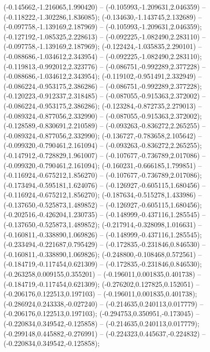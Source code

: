  (-0.145662,-1.216065,1.990420) -- (-0.105993,-1.209631,2.046359) -- (-0.118222,-1.302286,1.836085);
 (-0.134630,-1.143745,2.132689) -- (-0.097758,-1.139169,2.187969) -- (-0.105993,-1.209631,2.046359);
 (-0.127192,-1.085325,2.228613) -- (-0.092225,-1.082490,2.283110) -- (-0.097758,-1.139169,2.187969);
 (-0.122424,-1.035835,2.290101) -- (-0.088686,-1.034612,2.343954) -- (-0.092225,-1.082490,2.283110);
 (-0.119813,-0.992012,2.323776) -- (-0.086751,-0.992289,2.377228) -- (-0.088686,-1.034612,2.343954);
 (-0.119102,-0.951491,2.332949) -- (-0.086224,-0.953175,2.386286) -- (-0.086751,-0.992289,2.377228);
 (-0.120223,-0.912337,2.318485) -- (-0.087055,-0.915363,2.372002) -- (-0.086224,-0.953175,2.386286);
 (-0.123284,-0.872735,2.279013) -- (-0.089324,-0.877056,2.332990) -- (-0.087055,-0.915363,2.372002);
 (-0.128589,-0.830691,2.210589) -- (-0.093263,-0.836272,2.265255) -- (-0.089324,-0.877056,2.332990);
 (-0.136727,-0.783658,2.105642) -- (-0.099320,-0.790461,2.161094) -- (-0.093263,-0.836272,2.265255);
 (-0.147912,-0.728829,1.961007) -- (-0.107677,-0.736789,2.017086) -- (-0.099320,-0.790461,2.161094);
 (-0.160231,-0.666185,1.799851) -- (-0.116924,-0.675212,1.856270) -- (-0.107677,-0.736789,2.017086);
 (-0.173494,-0.595181,1.624076) -- (-0.126927,-0.605115,1.680456) -- (-0.116924,-0.675212,1.856270);
 (-0.187634,-0.515278,1.433986) -- (-0.137650,-0.525873,1.489852) -- (-0.126927,-0.605115,1.680456);
 (-0.202516,-0.426204,1.230735) -- (-0.148999,-0.437116,1.285545) -- (-0.137650,-0.525873,1.489852);
 (-0.217914,-0.328098,1.016631) -- (-0.160811,-0.338890,1.069826) -- (-0.148999,-0.437116,1.285545);
 (-0.233494,-0.221687,0.795429) -- (-0.172835,-0.231846,0.846530) -- (-0.160811,-0.338890,1.069826);
 (-0.248800,-0.108468,0.572561) -- (-0.184719,-0.117454,0.621309) -- (-0.172835,-0.231846,0.846530);
 (-0.263258,0.009155,0.355201) -- (-0.196011,0.001835,0.401738) -- (-0.184719,-0.117454,0.621309);
 (-0.276202,0.127825,0.152051) -- (-0.206176,0.122513,0.197103) -- (-0.196011,0.001835,0.401738);
 (-0.286924,0.243338,-0.027240) -- (-0.214635,0.240113,0.017779) -- (-0.206176,0.122513,0.197103);
 (-0.294753,0.350951,-0.173045) -- (-0.220834,0.349542,-0.125858) -- (-0.214635,0.240113,0.017779);
 (-0.299148,0.445882,-0.276991) -- (-0.224323,0.445637,-0.224832) -- (-0.220834,0.349542,-0.125858);
